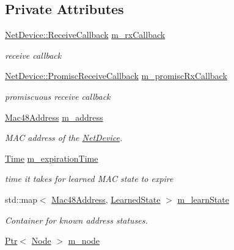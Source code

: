 \subsection*{Private Attributes}
\begin{DoxyCompactItemize}
\item 
\hyperlink{classns3_1_1NetDevice_ad5e5e1ca187472bc2ba99575d8def568}{Net\+Device\+::\+Receive\+Callback} \hyperlink{classns3_1_1BridgeNetDevice_a50ecd306e326a77a22666272606fe85a}{m\+\_\+rx\+Callback}
\begin{DoxyCompactList}\small\item\em receive callback \end{DoxyCompactList}\item 
\hyperlink{classns3_1_1NetDevice_a427225795919f26c414bee2ea3f31ed2}{Net\+Device\+::\+Promisc\+Receive\+Callback} \hyperlink{classns3_1_1BridgeNetDevice_ae930168508bfb61f8a7721e7a6312654}{m\+\_\+promisc\+Rx\+Callback}
\begin{DoxyCompactList}\small\item\em promiscuous receive callback \end{DoxyCompactList}\item 
\hyperlink{classns3_1_1Mac48Address}{Mac48\+Address} \hyperlink{classns3_1_1BridgeNetDevice_a3a8897765d112fe99d399a4b4b947d2f}{m\+\_\+address}
\begin{DoxyCompactList}\small\item\em M\+AC address of the \hyperlink{classns3_1_1NetDevice}{Net\+Device}. \end{DoxyCompactList}\item 
\hyperlink{classns3_1_1Time}{Time} \hyperlink{classns3_1_1BridgeNetDevice_a6b6c209fa78de612f218db0dd40b8319}{m\+\_\+expiration\+Time}
\begin{DoxyCompactList}\small\item\em time it takes for learned M\+AC state to expire \end{DoxyCompactList}\item 
std\+::map$<$ \hyperlink{classns3_1_1Mac48Address}{Mac48\+Address}, \hyperlink{structns3_1_1BridgeNetDevice_1_1LearnedState}{Learned\+State} $>$ \hyperlink{classns3_1_1BridgeNetDevice_a201ac30909835a3efd1b34470e8fb5ec}{m\+\_\+learn\+State}
\begin{DoxyCompactList}\small\item\em Container for known address statuses. \end{DoxyCompactList}\item 
\hyperlink{classns3_1_1Ptr}{Ptr}$<$ \hyperlink{classns3_1_1Node}{Node} $>$ \hyperlink{classns3_1_1BridgeNetDevice_a1880454d764d3c555c2fa71a9d66345e}{m\+\_\+node}

\end{DoxyCompactItemize}
